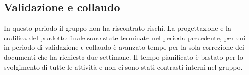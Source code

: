 \subsection{Validazione e collaudo} \label{valEcoll}
In questo periodo il gruppo non ha riscontrato rischi. La progettazione e la codifica del prodotto finale sono state terminate nel periodo
precedente, per cui in periodo di validazione e collaudo è avanzato tempo per la sola correzione dei documenti che ha richiesto due settimane.
Il tempo pianificato è bastato per lo svolgimento di tutte le attività e non ci sono stati contrasti interni nel gruppo.
